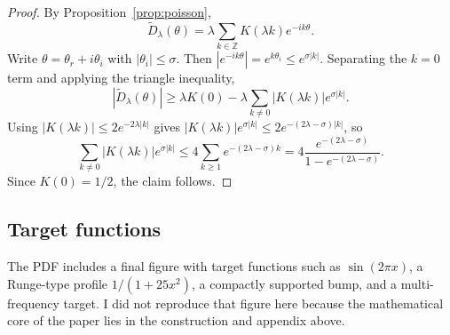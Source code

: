 \documentclass[11pt]{article}
\newcommand{\Z}{\mathbb{Z}}
\begin{document}
\begin{proof}
By Proposition~\ref{prop:poisson},
\[
\widetilde D_\lambda(\theta)=\lambda\sum_{k\in\Z}K(\lambda k)e^{-ik\theta}.
\]
Write $\theta=\theta_r+i\theta_i$ with $|\theta_i|\le \sigma$. Then $|e^{-ik\theta}|=e^{k\theta_i}\le e^{\sigma|k|}$. Separating the $k=0$ term and applying the triangle inequality,
\[
|\widetilde D_\lambda(\theta)|
\ge
\lambda K(0)-\lambda\sum_{k\ne 0}|K(\lambda k)|e^{\sigma|k|}.
\]
Using $|K(\lambda k)|\le 2e^{-2\lambda|k|}$ gives $|K(\lambda k)|e^{\sigma|k|}\le 2e^{-(2\lambda-\sigma)|k|}$, so
\[
\sum_{k\ne 0}|K(\lambda k)|e^{\sigma|k|}
\le 4\sum_{k\ge 1} e^{-(2\lambda-\sigma)k}
=4\frac{e^{-(2\lambda-\sigma)}}{1-e^{-(2\lambda-\sigma)}}.
\]
Since $K(0)=1/2$, the claim follows.
\end{proof}

\subsection{Target functions}
The PDF includes a final figure with target functions such as $\sin(2\pi x)$, a Runge-type profile $1/(1+25x^2)$, a compactly supported bump, and a multi-frequency target. I did not reproduce that figure here because the mathematical core of the paper lies in the construction and appendix above.
\end{document}
